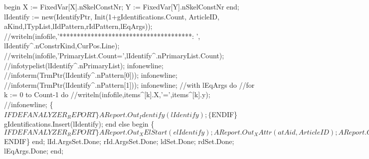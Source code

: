       begin X := FixedVar[X].nSkelConstNr; Y := FixedVar[Y].nSkelConstNr end;
      lIdentify := new(IdentifyPtr,
                       Init(1+gIdentifications.Count, ArticleID,
                        aKind,lTypList,lIdPattern,rIdPattern,lEqArgs));
//writeln(infofile,'**************************************: ', lIdentify^.nConstrKind,CurPos.Line);
//writeln(infofile,'PrimaryList.Count=',lIdentify^.nPrimaryList.Count);
//infotypelist(lIdentify^.nPrimaryList); infonewline;
//infoterm(TrmPtr(lIdentify^.nPattern[0])); infonewline;
//infoterm(TrmPtr(lIdentify^.nPattern[1])); infonewline;
//with lEqArgs do
//for k := 0 to Count-1 do
//writeln(infofile,items^[k].X,'=',items^[k].y);
//infonewline;
      \{$IFDEF ANALYZER_REPORT\}
      AReport.Out_Identify(lIdentify);
      \{$ENDIF\}
      gIdentifications.Insert(lIdentify);
   end
   else
   begin
      \{$IFDEF ANALYZER_REPORT\}
      AReport.Out_XElStart(elIdentify);
      AReport.Out_XAttr(atAid, ArticleID);
      AReport.Out_XIntAttr(atNr, 0);
      AReport.Out_XAttr(atConstrKind, aKind);
      AReport.Out_XAttrEnd;
      AReport.Out_XEl1(elErrorIdentify);
      AReport.Out_XElEnd(elIdentify);
      \{$ENDIF\}
   end;
   lId.ArgsSet.Done; rId.ArgsSet.Done;
   ldSet.Done; rdSet.Done;
   lEqArgs.Done;
end;
\eatline
{}\nwendcode{}\nwdocspar
